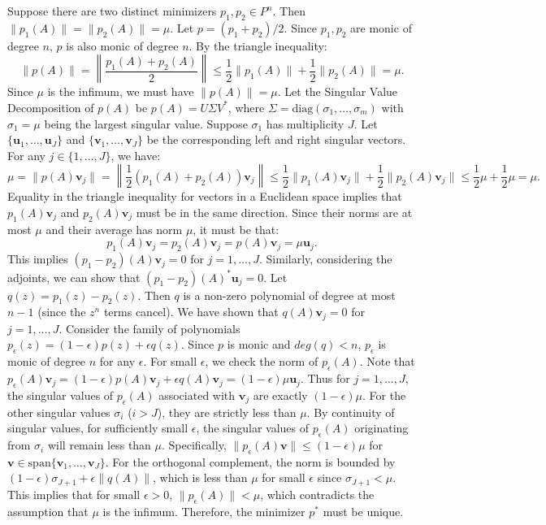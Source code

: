 \begin{solution}
Suppose there are two distinct minimizers $p_1, p_2 \in P^n$. Then $\|p_1(A)\| = \|p_2(A)\| = \mu$.
Let $p = (p_1 + p_2)/2$. Since $p_1, p_2$ are monic of degree $n$, $p$ is also monic of degree $n$. By the triangle inequality:
\[
\|p(A)\| = \left\| \frac{p_1(A) + p_2(A)}{2} \right\| \leq \frac{1}{2} \|p_1(A)\| + \frac{1}{2} \|p_2(A)\| = \mu.
\]
Since $\mu$ is the infimum, we must have $\|p(A)\| = \mu$.
Let the Singular Value Decomposition of $p(A)$ be $p(A) = U \Sigma V^*$, where $\Sigma = \text{diag}(\sigma_1, \dots, \sigma_m)$ with $\sigma_1 = \mu$ being the largest singular value.
Suppose $\sigma_1$ has multiplicity $J$. Let $\{\mathbf{u}_1, \dots, \mathbf{u}_J\}$ and $\{\mathbf{v}_1, \dots, \mathbf{v}_J\}$ be the corresponding left and right singular vectors.
For any $j \in \{1, \dots, J\}$, we have:
\[
\mu = \|p(A) \mathbf{v}_j\| = \left\| \frac{1}{2} (p_1(A) + p_2(A)) \mathbf{v}_j \right\| \leq \frac{1}{2} \|p_1(A) \mathbf{v}_j\| + \frac{1}{2} \|p_2(A) \mathbf{v}_j\| \leq \frac{1}{2} \mu + \frac{1}{2} \mu = \mu.
\]
Equality in the triangle inequality for vectors in a Euclidean space implies that $p_1(A) \mathbf{v}_j$ and $p_2(A) \mathbf{v}_j$ must be in the same direction. Since their norms are at most $\mu$ and their average has norm $\mu$, it must be that:
\[
p_1(A) \mathbf{v}_j = p_2(A) \mathbf{v}_j = p(A) \mathbf{v}_j = \mu \mathbf{u}_j.
\]
This implies $(p_1 - p_2)(A) \mathbf{v}_j = 0$ for $j=1, \dots, J$.
Similarly, considering the adjoints, we can show that $(p_1 - p_2)(A)^* \mathbf{u}_j = 0$.
Let $q(z) = p_1(z) - p_2(z)$. Then $q$ is a non-zero polynomial of degree at most $n-1$ (since the $z^n$ terms cancel).
We have shown that $q(A) \mathbf{v}_j = 0$ for $j=1, \dots, J$.
Consider the family of polynomials $p_\epsilon(z) = (1-\epsilon) p(z) + \epsilon q(z)$. Since $p$ is monic and $deg(q) < n$, $p_\epsilon$ is monic of degree $n$ for any $\epsilon$.
For small $\epsilon$, we check the norm of $p_\epsilon(A)$.
Note that $p_\epsilon(A) \mathbf{v}_j = (1-\epsilon) p(A) \mathbf{v}_j + \epsilon q(A) \mathbf{v}_j = (1-\epsilon) \mu \mathbf{u}_j$.
Thus for $j=1, \dots, J$, the singular values of $p_\epsilon(A)$ associated with $\mathbf{v}_j$ are exactly $(1-\epsilon) \mu$.
For the other singular values $\sigma_i$ ($i > J$), they are strictly less than $\mu$. By continuity of singular values, for sufficiently small $\epsilon$, the singular values of $p_\epsilon(A)$ originating from $\sigma_i$ will remain less than $\mu$.
Specifically, $\|p_\epsilon(A) \mathbf{v}\| \leq (1-\epsilon) \mu$ for $\mathbf{v} \in \text{span}\{\mathbf{v}_1, \dots, \mathbf{v}_J\}$.
For the orthogonal complement, the norm is bounded by $(1-\epsilon) \sigma_{J+1} + \epsilon \|q(A)\|$, which is less than $\mu$ for small $\epsilon$ since $\sigma_{J+1} < \mu$.
This implies that for small $\epsilon > 0$, $\|p_\epsilon(A)\| < \mu$, which contradicts the assumption that $\mu$ is the infimum.
Therefore, the minimizer $p^*$ must be unique.
\end{solution}
